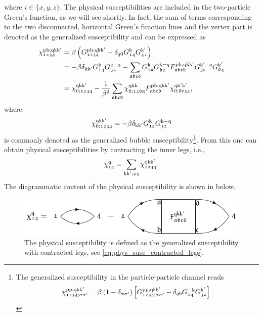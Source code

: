 \documentclass[\main/main.tex]{subfiles}
\begin{document}
where $i\in\{x,y,z\}$. The physical susceptibilities are included in the two-particle Green's function, as we will see shortly. In fact, the sum of terms corresponding to the two disconnected, horizontal Green's function lines and the vertex part is denoted as the generalized susceptibility and can be expressed as
\begin{align}\label{eq:generalized_susceptibility}
\begin{split}
	\chi_{\mathfrak{1234}}^{\text{ph};\text{q}\text{k}\text{k}'}&=\beta\left (G_{\mathfrak{1234}}^{\text{ph};\text{q}\text{k}\text{k}'}-\delta_{q0}G_{\mathfrak{14}}^{\text{k}} G_{\mathfrak{32}}^{\text{k}'}\right )\\
	&=-\beta\delta_{\text{k}\text{k}'}G_{\mathfrak{14}}^{\text{k}}G_{\mathfrak{32}}^{\text{k}-\text{q}}-\sum_{\mathfrak{abcd}} G_{\mathfrak{1a}}^{\text{k}} G_{\mathfrak{b2}}^{\text{k}-q} F_{\mathfrak{abcd}}^{\text{ph};\text{q}\text{k}\text{k}'} G_{\mathfrak{3c}}^{\text{k}'-q} G_{\mathfrak{d4}}^{\text{k}'}\\
	&=\chi_{0;\mathfrak{1234}}^{\text{q}\text{k}\text{k}'}-\frac{1}{\beta^2}\sum_{\mathfrak{abcd}}\chi_{0;\mathfrak{12ba}}^{\text{q}\text{k}\text{k}} F_{\mathfrak{abcd}}^{\text{ph};\text{q}\text{k}\text{k}'} \chi_{0;\mathfrak{dc34}}^{\text{q}\text{k}'\text{k}'},
\end{split}
\end{align}
where
\begin{align}
	\chi_{0;\mathfrak{1234}}^{\text{q}\text{k}\text{k}'}=-\beta\delta_{\text{k}\text{k}'}G_{\mathfrak{14}}^{\text{k}}G_{\mathfrak{32}}^{\text{k}-\text{q}}
\end{align}
is commonly denoted as the generalized bubble susceptibility\footnote{The generalized susceptibility in the particle-particle channel reads
\begin{align}\label{eq:generalized_susceptibility_pp_ssp}
	\chi_{\mathfrak{1234};\sigma\sigma'}^{\text{pp};\text{q}\text{k}\text{k}'}=\beta\left (1-\delta_{\sigma\sigma'}\right )\left [G_{\mathfrak{1234};\sigma\sigma'}^{\text{pp};\text{q}\text{k}\text{k}'}-\delta_{q0}G_{\mathfrak{14}}^{-\text{k}} G_{\mathfrak{32}}^{\text{k}'}\right ].
\end{align}
}. From this one can obtain physical susceptibilities by contracting the inner legs, i.e.,
\begin{align}\label{eq:phys_susc_contracted_legs}
	\chi_{\mathfrak{14}}^{\text{q}}=\sum_{\text{k}\text{k}';\mathfrak{23}}\chi_{\mathfrak{1234}}^{\text{q}\text{k}\text{k}'}.
\end{align}
The diagrammatic content of the physical susceptibility is shown in  below.
\begin{figure}[ht!]
	\centering
	\includegraphics[scale=1.2]{Graphics/Diagrams/physical_susceptibility/physical_susceptibility}
	\caption{The physical susceptibility is defined as the generalized susceptibility with contracted legs, see \eqref{eq:phys_susc_contracted_legs}.}
	\label{fig:physical_susceptibility}
\end{figure}
\end{document}
